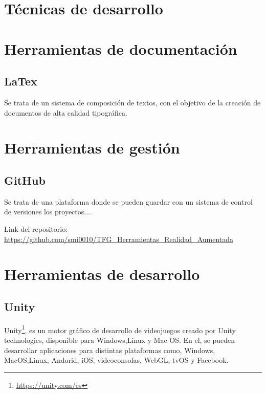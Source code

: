 

\section{Técnicas de desarrollo}

\section{Herramientas de documentación}
\subsection{LaTex}
Se trata de un sistema de composición de textos, con el objetivo de la creación de documentos de alta calidad tipográfica.
\section{Herramientas de gestión}
\subsection{GitHub}
Se trata de una plataforma donde se pueden guardar con un sistema de control de versiones los proyectos....

 Link del repositorio: \url{https://github.com/smi0010/TFG_Herramientas_Realidad_Aumentada}

\section{Herramientas de desarrollo}
\subsection{Unity}
Unity\footnote{\url{https://unity.com/es}}, es un motor gráfico de desarrollo de videojuegos creado por Unity technologies, disponible para Windows,Linux y Mac OS. En el, se pueden desarrollar aplicaciones para distintas plataformas como, Windows, MacOS,Linux, Andorid, iOS, videoconsolas, WebGL, tvOS y Facebook.


